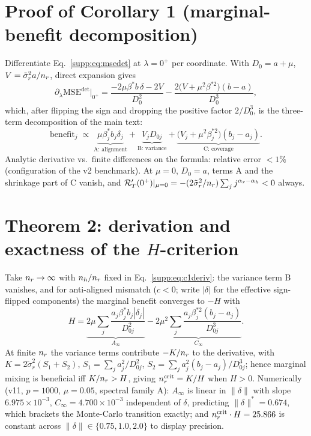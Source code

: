 \section{Proof of Corollary 1 (marginal-benefit decomposition)}
\label{supp:c1}

Differentiate Eq.~\eqref{supp:eq:msedet} at $\lambda = 0^+$ per coordinate.
With $D_0 = a + \mu$, $V = \tilde\sigma_r^2 a/n_r$, direct expansion gives
\begin{equation}
  \partial_\lambda \mathrm{MSE}^{\det}\big|_{0^+} = \frac{-2\mu\beta^* b\, \delta - 2V}{D_0^2} - \frac{2\big(V + \mu^2\beta^{*2}\big)(b - a)}{D_0^3},
  \label{supp:eq:c1deriv}
\end{equation}
which, after flipping the sign and dropping the positive factor $2/D_0^3$, is the three-term decomposition of the main text:
\begin{equation}
  \mathrm{benefit}_j \;\propto\; \underbrace{\mu\beta^*_j b_j \delta_j}_{\text{A: alignment}} + \underbrace{V_j D_{0j}}_{\text{B: variance}} + \underbrace{\big(V_j + \mu^2\beta_j^{*2}\big)(b_j - a_j)}_{\text{C: coverage}} .
  \label{supp:eq:c1}
\end{equation}
Analytic derivative vs.\ finite differences on the formula: relative error $<1\%$ (configuration of the v2 benchmark).
At $\mu = 0$, $D_0 = a$, terms A and the shrinkage part of C vanish, and
$\mathcal{R}_T'(0^+)|_{\mu=0} = -(2\tilde\sigma_r^2/n_r)\sum_j j^{\alpha_r-\alpha_h} < 0$ always.

\section{Theorem 2: derivation and exactness of the $H$-criterion}
\label{supp:h}

Take $n_r \to \infty$ with $n_h/n_r$ fixed in Eq.~\eqref{supp:eq:c1deriv}: the variance term B vanishes, and for anti-aligned mismatch ($c < 0$; write $|\delta|$ for the effective sign-flipped components) the marginal benefit converges to $-H$ with
\begin{equation}
  H = \underbrace{2\mu \sum_j \frac{a_j\beta^*_j b_j |\delta_j|}{D_{0j}^2}}_{A_\infty} - \underbrace{2\mu^2 \sum_j \frac{a_j\beta_j^{*2}(b_j - a_j)}{D_{0j}^3}}_{C_\infty}.
  \label{supp:eq:h}
\end{equation}
At finite $n_r$ the variance terms contribute $-K/n_r$ to the derivative, with $K = 2\tilde\sigma_r^2(S_1 + S_2)$, $S_1 = \sum_j a_j^2/D_{0j}^2$, $S_2 = \sum_j a_j^2(b_j-a_j)/D_{0j}^3$; hence marginal mixing is beneficial iff $K/n_r > H$, giving $n_r^{\mathrm{crit}} = K/H$ when $H > 0$.
Numerically (v11, $p = 1000$, $\mu = 0.05$, spectral family A): $A_\infty$ is linear in $\|\delta\|$ with slope $6.975\times10^{-3}$, $C_\infty = 4.700\times10^{-3}$ independent of $\delta$, predicting $\|\delta\|^* = 0.674$, which brackets the Monte-Carlo transition exactly; and $n_r^{\mathrm{crit}}\cdot H = 25.866$ is constant across $\|\delta\| \in \{0.75, 1.0, 2.0\}$ to display precision.

